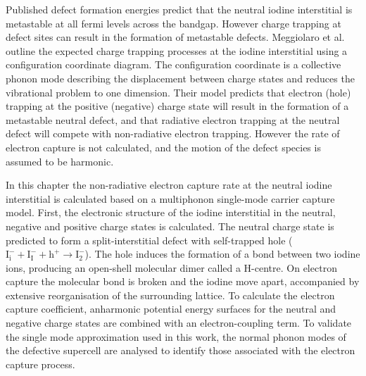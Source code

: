 Published defect formation energies predict that the neutral iodine interstitial is metastable at all fermi levels across the bandgap.\autocite{Du2015,Meggiolaro2018}
However charge trapping at defect sites can result in the formation of metastable defects.
Meggiolaro et al. outline the expected charge trapping processes at the iodine interstitial using a configuration coordinate diagram.\autocite{Meggiolaro2018}
The configuration coordinate is a collective phonon mode describing the displacement between charge states and reduces the vibrational problem to one dimension.
Their model predicts that electron (hole) trapping at the positive (negative) charge state will result in the formation of a metastable neutral defect, and that radiative electron trapping at the neutral defect will compete with non-radiative electron trapping.
However the rate of electron capture is not calculated, and the motion of the defect species is assumed to be harmonic.

In this chapter the non-radiative electron capture rate at the neutral iodine interstitial is calculated based on a multiphonon single-mode carrier capture model.  %
First, the electronic structure of the iodine interstitial in the neutral, negative and positive charge states is calculated. The neutral charge state is predicted to form a split-interstitial defect with self-trapped hole ($\mathrm{I}_\mathrm{i}^-+\mathrm{I}_\mathrm{I}^-+\mathrm{h}^+ \rightarrow \mathrm{I}_\mathrm{2}^-$). The hole induces the formation of a bond between two iodine ions, producing an open-shell molecular dimer called a H-centre.\autocite{Castner1957} On electron capture the molecular bond is broken and the iodine move apart, accompanied by extensive reorganisation of the surrounding lattice. 
To calculate the electron capture coefficient, anharmonic potential energy surfaces for the neutral and negative charge states are combined with an electron-coupling term.
To validate the single mode approximation used in this work, the normal phonon modes of the defective supercell are analysed to identify those associated with the electron capture process.

